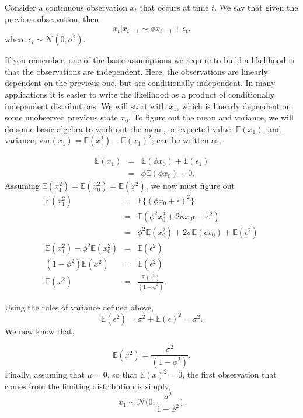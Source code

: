 \documentclass[
]{article}
\begin{document}
Consider a continuous observation \(x_t\) that occurs at time \(t\). We
say that given the previous observation, then \[
  x_t|x_{t-1} \sim \phi x_{t-1} + \epsilon_t.
\] where \(\epsilon_t \sim \mathcal{N}(0,\sigma^2)\).

If you remember, one of the basic assumptions we require to build a
likelihood is that the observations are independent. Here, the
observations are linearly dependent on the previous one, but are
conditionally independent. In many applications it is easier to write
the likelihood as a product of conditionally independent distributions.
We will start with \(x_1\), which is linearly dependent on some
unobserved previous state \(x_0\). To figure out the mean and variance,
we will do some basic algebra to work out the mean, or expected value,
\(\mathbb{E}(x_1)\), and variance,
\(\text{var}(x_1) = \mathbb{E}(x_1^2) - \mathbb{E}(x_1)^2\), can be
written as,

\begin{eqnarray}
  \mathbb{E}(x_1) & = & \mathbb{E}(\phi x_0) + \mathbb{E}(\epsilon_1)\\
                  & = & \phi \mathbb{E}(\phi x_0) + 0.
\end{eqnarray} Assuming
\(\mathbb{E}(x_1^2) = \mathbb{E}(x_0^2) = \mathbb{E}(x^2)\), we now must
figure out \begin{eqnarray}
  \mathbb{E}(x_1^2) & = & \mathbb{E}\{(\phi x_0 + \epsilon)^2\}\\
                    & = & \mathbb{E}(\phi^2 x_0^2 + 2\phi x_0 \epsilon + \epsilon^2)\\
                    & = & \phi^2 \mathbb{E}(x_0^2) + 2\phi  \mathbb{E}(\epsilon x_0) + \mathbb{E}(\epsilon^2)\\
  \mathbb{E}(x_1^2) - \phi^2 \mathbb{E}(x_0^2) & = & \mathbb{E}(\epsilon^2)\\
  (1-\phi^2) \mathbb{E}(x^2) & = & \mathbb{E}(\epsilon^2)\\
  \mathbb{E}(x^2) & = & \frac{\mathbb{E}(\epsilon^2)}{ (1-\phi^2) }.  
\end{eqnarray}

Using the rules of variance defined above, \[
  \mathbb{E}(\epsilon^2) = \sigma^2 +\mathbb{E}(\epsilon)^2 = \sigma^2.
\] We now know that,

\[
  \mathbb{E}(x^2) = \frac{\sigma^2}{ (1-\phi^2) }.  
\] Finally, assuming that \(\mu = 0\), so that \(\mathbb{E}(x)^2 = 0\),
the first observation that comes from the limiting distribution is
simply, \[
  x_1 \sim \mathcal{N}\Big(0, \frac{\sigma^2}{1-\phi^2}\Big).
\]
\end{document}
